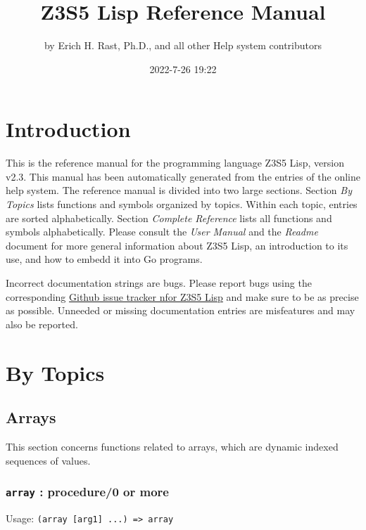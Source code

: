 \documentclass[
]{article}
\title{Z3S5 Lisp Reference Manual}
\author{by Erich H. Rast, Ph.D., and all other Help system contributors}
\date{2022-7-26 19:22}
\newcommand{\passthrough}[1]{#1}
\begin{document}
\maketitle

\hypertarget{introduction}{%
\section{Introduction}\label{introduction}}

This is the reference manual for the programming language Z3S5 Lisp,
version v2.3. This manual has been automatically generated from the
entries of the online help system. The reference manual is divided into
two large sections. Section \emph{By Topics} lists functions and symbols
organized by topics. Within each topic, entries are sorted
alphabetically. Section \emph{Complete Reference} lists all functions
and symbols alphabetically. Please consult the \emph{User Manual} and
the \emph{Readme} document for more general information about Z3S5 Lisp,
an introduction to its use, and how to embedd it into Go programs.

Incorrect documentation strings are bugs. Please report bugs using the
corresponding \href{https://github.com/rasteric/z3s5-lisp/issues}{Github
issue tracker nfor Z3S5 Lisp} and make sure to be as precise as
possible. Unneeded or missing documentation entries are misfeatures and
may also be reported.

\hypertarget{by-topics}{%
\section{By Topics}\label{by-topics}}

\hypertarget{arrays}{%
\subsection{Arrays}\label{arrays}}

This section concerns functions related to arrays, which are dynamic
indexed sequences of values.

\hypertarget{array-procedure0-or-more}{%
\subsubsection{\texorpdfstring{\texttt{array} : procedure/0 or
more}{array : procedure/0 or more}}\label{array-procedure0-or-more}}

Usage: \passthrough{\lstinline!(array [arg1] ...) => array!}
\end{document}
